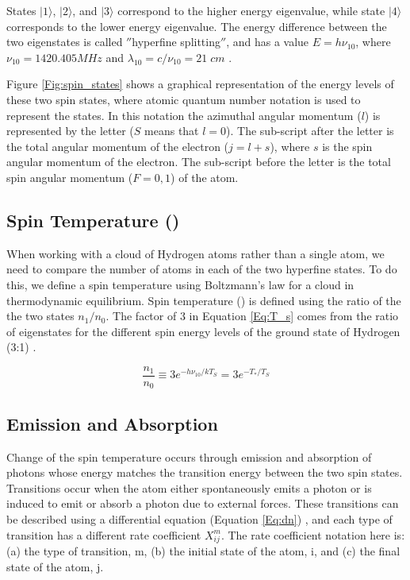 States $| 1 \rangle$, $| 2 \rangle$, and $| 3 \rangle$ correspond to the higher energy eigenvalue, while state $| 4 \rangle$ corresponds to the lower energy eigenvalue. The energy difference between the two eigenstates is called $''$hyperfine splitting$''$, and has a value $E = h \nu_{10}$, where $\nu_{10}=1420.405 MHz$ and $\lambda_{10} = c /\nu_{10} = 21 \; cm$ \cite{townsend2000}. 

Figure \ref{Fig:spin_states} shows a graphical representation of the energy levels of these two spin states, where atomic quantum number notation is used to represent the states. In this notation the azimuthal angular momentum ($l$) is represented by the letter ($S$ means that $l=0$). The sub-script after the letter is the total angular momentum of the electron ($j=l+s$), where $s$ is the spin angular momentum of the electron. The sub-script before the letter is the total spin angular momentum ($F=0,1$) of the atom. 


\subsection{Spin Temperature (\ts)}

When working with a cloud of Hydrogen atoms rather than a single atom, we need to compare the number of atoms in each of the two hyperfine states. To do this, we define a spin temperature using Boltzmann's law for a cloud in thermodynamic equilibrium. Spin temperature (\ts) is defined using the ratio of the the two states $n_1/n_0$. The factor of 3 in Equation \ref{Eq:T_s} comes from the ratio of eigenstates for the different spin energy levels of the ground state of Hydrogen (3:1) \cite{field_1958}. 

\begin{equation}\label{Eq:T_s}
\frac{n_1}{n_0} \equiv 3 e^{- h \nu_{10} / kT_S} = 3 e^{-T_*/T_S}
\end{equation} 


\subsection{Emission and Absorption} \label{Sec:dT_S}

Change of the spin temperature occurs through emission and absorption of photons whose energy matches the transition energy between the two spin states. Transitions occur when the atom either spontaneously emits a photon or is induced to emit or absorb a photon due to external forces. These transitions can be described using a differential equation (Equation \ref{Eq:dn}) \cite{furlanetto_2006}, and each type of transition has a different rate coefficient $X^m_{ij}$. The rate coefficient notation here is: (a) the type of transition, m, (b) the initial state of the atom, i, and (c) the final state of the atom, j. 

